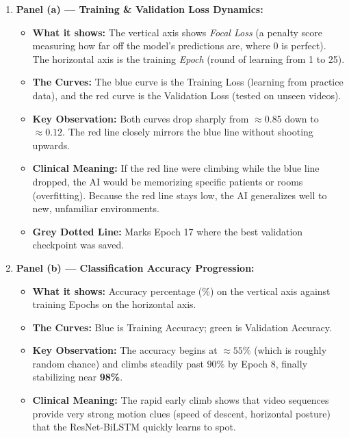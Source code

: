 \documentclass[11pt,a4paper]{article}
\begin{document}
\begin{enumerate}
    \item \textbf{Panel (a) --- Training \& Validation Loss Dynamics:}
    \begin{itemize}
        \item \textbf{What it shows:} The vertical axis shows \textit{Focal Loss} (a penalty score measuring how far off the model's predictions are, where 0 is perfect). The horizontal axis is the training \textit{Epoch} (round of learning from 1 to 25).
        \item \textbf{The Curves:} The blue curve is the Training Loss (learning from practice data), and the red curve is the Validation Loss (tested on unseen videos).
        \item \textbf{Key Observation:} Both curves drop sharply from $\approx 0.85$ down to $\approx 0.12$. The red line closely mirrors the blue line without shooting upwards.
        \item \textbf{Clinical Meaning:} If the red line were climbing while the blue line dropped, the AI would be memorizing specific patients or rooms (overfitting). Because the red line stays low, the AI generalizes well to new, unfamiliar environments.
        \item \textbf{Grey Dotted Line:} Marks Epoch 17 where the best validation checkpoint was saved.
    \end{itemize}

    \item \textbf{Panel (b) --- Classification Accuracy Progression:}
    \begin{itemize}
        \item \textbf{What it shows:} Accuracy percentage (\%) on the vertical axis against training Epochs on the horizontal axis.
        \item \textbf{The Curves:} Blue is Training Accuracy; green is Validation Accuracy.
        \item \textbf{Key Observation:} The accuracy begins at $\approx 55\%$ (which is roughly random chance) and climbs steadily past $90\%$ by Epoch 8, finally stabilizing near \textbf{98\%}.
        \item \textbf{Clinical Meaning:} The rapid early climb shows that video sequences provide very strong motion clues (speed of descent, horizontal posture) that the ResNet-BiLSTM quickly learns to spot.
    \end{itemize}


\end{enumerate}
\end{document}
